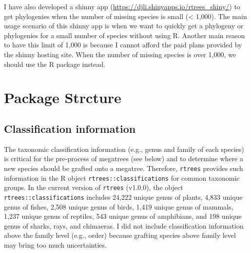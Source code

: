 \documentclass[
  12pt,
]{article}
\begin{document}
I have also developed a shinny app (\url{https://djli.shinyapps.io/rtrees_shiny/}) to get phylogenies when the number of missing species is small (\textless{} 1,000). The main usage scenario of this shinny app is when we want to quickly get a phylogeny or phylogenies for a small number of species without using R. Another main reason to have this limit of 1,000 is because I cannot afford the paid plans provided by the shinny hosting site. When the number of missing species is over 1,000, we should use the R package instead.

\hypertarget{package-strcture}{%
\section{Package Strcture}\label{package-strcture}}

\hypertarget{classification-information}{%
\subsection{Classification information}\label{classification-information}}

The taxonomic classification information (e.g., genus and family of each species) is critical for the pre-process of megatrees (see below) and to determine where a new species should be grafted onto a megatree. Therefore, \texttt{rtrees} provides such information in the R object \texttt{rtrees::classifications} for common taxonomic groups. In the current version of \texttt{rtrees} (v1.0.0), the object \texttt{rtrees::classifications} includes 24,222 unique genus of plants, 4,833 unique genus of fishes, 2,508 unique genus of birds, 1,419 unique genus of mammals, 1,237 unique genus of reptiles, 543 unique genus of amphibians, and 198 unique genus of sharks, rays, and chimaeras. I did not include classification information above the family level (e.g., order) because grafting species above family level may bring too much uncertainties.
\end{document}
